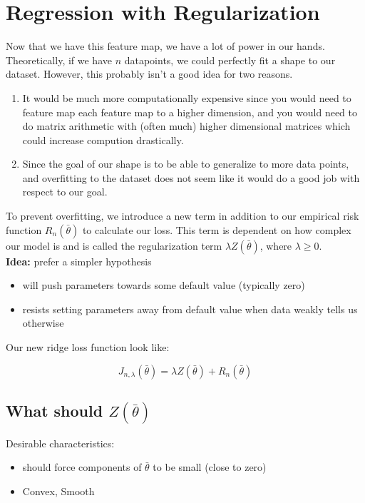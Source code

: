 \documentclass[12pt]{article}
\begin{document}
\section{Regression with Regularization}

Now that we have this feature map, we have a lot of power in our hands. Theoretically, if we have $n$ datapoints, we could perfectly fit a shape to our dataset. However, this probably isn't a good idea for two reasons. 
\begin{enumerate}
	\item It would be much more computationally expensive since you would need to feature map each feature map to a higher dimension, and you would need to do matrix arithmetic with (often much) higher dimensional matrices which could increase compution drastically.
	\item Since the goal of our shape is to be able to generalize to more data points, and overfitting to the dataset does not seem like it would do a good job with respect to our goal.
\end{enumerate}
To prevent overfitting, we introduce a new term in addition to our empirical risk function $R_n(\bar{\theta})$ to calculate our loss. This term is dependent on how complex our model is and is called the regularization term $\lambda Z(\bar{\theta})$, where $\lambda \ge 0$.\\

\textbf{Idea:} prefer a simpler hypothesis

\begin{itemize}
	\item will push parameters towards some default value (typically zero)
	\item resists setting parameters away from default value when data weakly tells us otherwise
\end{itemize}

Our new ridge loss function look like:

\[ J_{n,\lambda} (\bar{\theta}) = \lambda Z(\bar{\theta}) + R_n(\bar{\theta}) \]

\subsection{What should $Z(\bar{\theta})$}

Desirable characteristics:
\begin{itemize}
	\item should force components of $\bar{\theta}$ to be small (close to zero)
	\item Convex, Smooth
\end{itemize}
\end{document}
